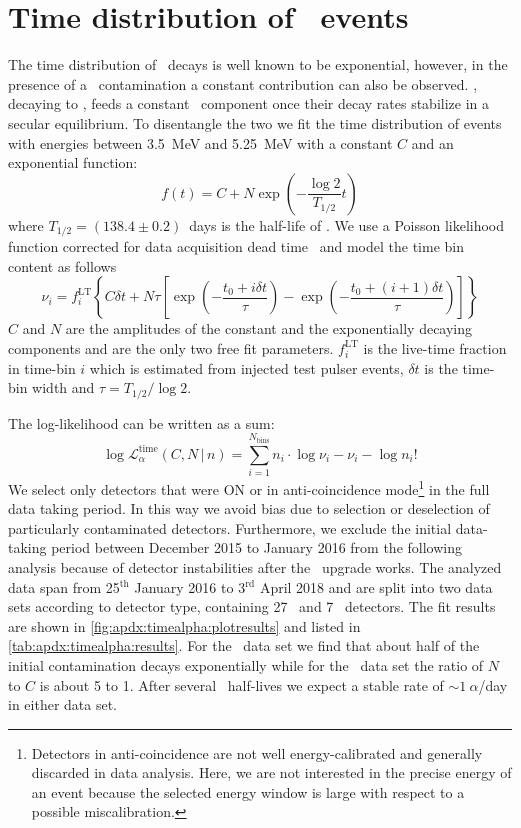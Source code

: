
\chapter{\texorpdfstring{Time distribution of \a\ events}{Time distribution of alpha-events}}%
\label{apdx:timealpha}

The time distribution of \Po\ decays is well known to be exponential, however, in the
presence of a \Pbl\ contamination a constant contribution can also be observed. \Pbl,
decaying to \Po, feeds a constant \Po\ component once their decay rates stabilize in a
secular equilibrium. To disentangle the two we fit the time distribution of events with
energies between 3.5~MeV and 5.25~MeV with a constant $C$ and an exponential function:
\[
  f(t) = C + N \exp\left( - \frac{\log2}{T_{1/2}}t \right)
\]
where $T_{1/2}=(138.4\pm0.2)$~days is the half-life of \Po. We use a Poisson likelihood
function corrected for data acquisition dead time~\cite{Cleveland1983} and model the time
bin content as follows
\[
  \nu_i = f_i^{\mathrm{LT}}
  \left\{ C \delta t + N \tau
    \left[
      \exp\left( -\frac{t_0 + i \delta t}{\tau} \right)  -
      \exp\left( -\frac{t_0 + (i+1) \delta t}{\tau} \right)
    \right]
  \right\}
\]
$C$ and $N$ are the amplitudes of the constant and the exponentially decaying components
and are the only two free fit parameters.  $f_i^{\mathrm{LT}}$ is the live-time fraction
in time-bin $i$ which is estimated from injected test pulser events, $\delta t$ is the
time-bin width and $\tau = T_{1/2} / \log2$.

The log-likelihood can be written as a sum:
\[
  \log \mathcal{L}_\alpha^\text{time}(C,N \,|\, n) =
  \sum_{i=1}^{N_\text{bins}} n_i \cdot
  \log\nu_i - \nu_i - \log n_i!
\]
We select only detectors that were ON or in anti-coincidence mode\footnote{Detectors in
anti-coincidence are not well energy-calibrated and generally discarded in data analysis.
Here, we are not interested in the precise energy of an event because the selected energy
window is large with respect to a possible miscalibration.} in the full data taking
period. In this way we avoid bias due to selection or deselection of particularly
contaminated detectors. Furthermore, we exclude the initial data-taking period between
December 2015 to January 2016 from the following analysis because of detector
instabilities after the \phasetwo\ upgrade works. The analyzed data span from
25$^\text{th}$ January 2016 to 3$^\text{rd}$ April 2018 and are split into two data sets
according to detector type, containing 27 \bege\ and 7 \scoax\ detectors. The fit results
are shown in \autoref{fig:apdx:timealpha:plotresults} and listed in
\cref{tab:apdx:timealpha:results}. For the \bege\ data set we find that about half of the
initial contamination decays exponentially while for the \scoax\ data set the ratio of $N$
to $C$ is about 5 to 1. After several \Po\ half-lives we expect a stable rate of
$\sim1~\alpha$/day in either data set.

